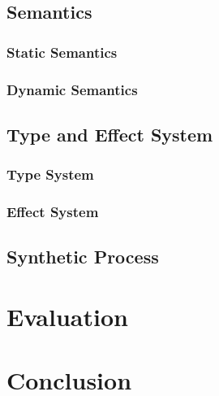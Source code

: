 \documentclass[12pt, a4paper, titlepage]{report}
\begin{document}
  \section{Semantics}
    \subsection{Static Semantics} %
    \subsection{Dynamic Semantics} %
  \section{Type and Effect System}
    \subsection{Type System}
    \subsection{Effect System}
  \section{Synthetic Process}

\chapter{Evaluation} %

\chapter{Conclusion} %



\end{document}
